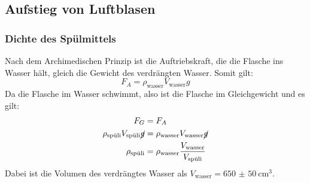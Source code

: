 \newcommand{\spuli}{\text{spüli}}
\newcommand{\wasser}{\text{wasser}}
\subsection{Aufstieg von Luftblasen}
	\subsubsection{Dichte des Spülmittels}
		Nach dem Archimedischen Prinzip ist die Auftriebskraft, die die Flasche ins Wasser hält, gleich die Gewicht des verdrängten Wasser. Somit gilt:
		\begin{equation}
			F_A = \rho_\wasser V_\wasser g
		\end{equation}
		Da die Flasche im Wasser schwimmt, also ist die Flasche im Gleichgewicht und es gilt:
		\begin{align}
			F_G &= F_A \\
			\rho_\spuli V_\spuli \cancel{g} &= \rho_\wasser V_\wasser \cancel{g} \\
			\rho_\spuli &= \rho_\wasser \frac{V_\wasser}{V_\spuli}
		\end{align}
		Dabei ist die Volumen des verdrängtes Wasser als $V_\wasser = \SI{650(50)}{\centi\meter\cubed}$.

